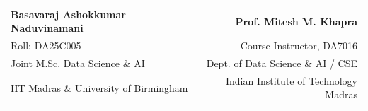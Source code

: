 \documentclass[11pt,a4paper]{article}
\begin{document}
\vspace{1.5cm}
\noindent
\begin{tabularx}{\linewidth}{X r}
    \textbf{Basavaraj Ashokkumar Naduvinamani} & \textbf{Prof. Mitesh M. Khapra} \\
    Roll: DA25C005 & Course Instructor, DA7016 \\
    Joint M.Sc. Data Science \& AI & Dept. of Data Science \& AI / CSE \\
    IIT Madras \& University of Birmingham & Indian Institute of Technology Madras \\
\end{tabularx}

\newpage
\printbibliography[heading=bibintoc, title={References}]
\end{document}
